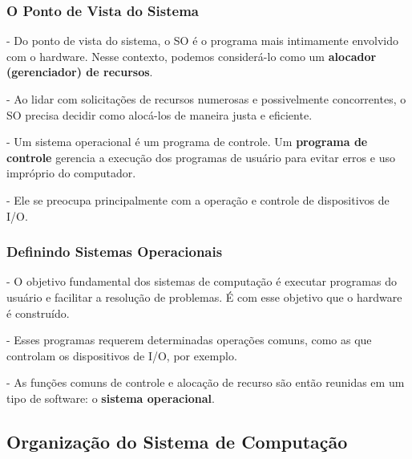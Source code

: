 \documentclass[a4paper, 11pt]{article}
\begin{document}
\subsubsection{O Ponto de Vista do Sistema}
- Do ponto de vista do sistema, o SO é o programa mais intimamente envolvido com o hardware. Nesse contexto, podemos considerá-lo como um \textbf{alocador (gerenciador) de recursos}.

- Ao lidar com solicitações de recursos numerosas e possivelmente concorrentes, o SO precisa decidir como alocá-los de maneira justa e eficiente.

- Um sistema operacional é um programa de controle. Um \textbf{programa de controle} gerencia a execução dos programas de usuário para evitar erros e uso impróprio do computador.

- Ele se preocupa principalmente com a operação e controle de dispositivos de I/O.


\subsubsection{Definindo Sistemas Operacionais}
- O objetivo fundamental dos sistemas de computação é executar programas do usuário e facilitar a resolução de problemas. É com esse objetivo que o hardware é construído.

- Esses programas requerem determinadas operações comuns, como as que controlam os dispositivos de I/O, por exemplo.

- As funções comuns de controle e alocação de recurso são então reunidas em um tipo de software: o \textbf{sistema operacional}.

\subsection{Organização do Sistema de Computação}


\end{document}
